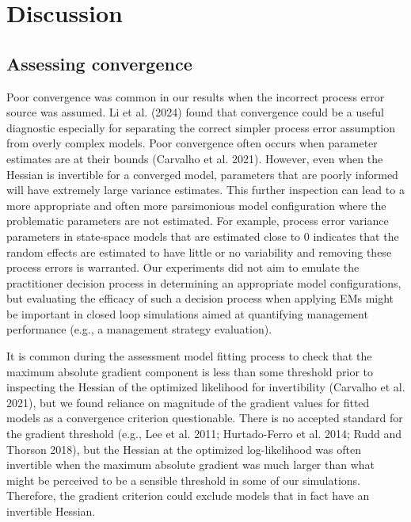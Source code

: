 \documentclass[
  12pt,
]{article}
\begin{document}
\section*{Discussion}\label{discussion}

\subsection*{Assessing convergence}\label{assessing-convergence}

Poor convergence was common in our results when the incorrect process
error source was assumed. Li et al. (2024) found that convergence could
be a useful diagnostic especially for separating the correct simpler
process error assumption from overly complex models. Poor convergence
often occurs when parameter estimates are at their bounds (Carvalho et
al. 2021). However, even when the Hessian is invertible for a converged
model, parameters that are poorly informed will have extremely large
variance estimates. This further inspection can lead to a more
appropriate and often more parsimonious model configuration where the
problematic parameters are not estimated. For example, process error
variance parameters in state-space models that are estimated close to 0
indicates that the random effects are estimated to have little or no
variability and removing these process errors is warranted. Our
experiments did not aim to emulate the practitioner decision process in
determining an appropriate model configurations, but evaluating the
efficacy of such a decision process when applying EMs might be important
in closed loop simulations aimed at quantifying management performance
(e.g., a management strategy evaluation).

It is common during the assessment model fitting process to check that
the maximum absolute gradient component is less than some threshold
prior to inspecting the Hessian of the optimized likelihood for
invertibility (Carvalho et al. 2021), but we found reliance on magnitude
of the gradient values for fitted models as a convergence criterion
questionable. There is no accepted standard for the gradient threshold
(e.g., Lee et al. 2011; Hurtado-Ferro et al. 2014; Rudd and Thorson
2018), but the Hessian at the optimized log-likelihood was often
invertible when the maximum absolute gradient was much larger than what
might be perceived to be a sensible threshold in some of our
simulations. Therefore, the gradient criterion could exclude models that
in fact have an invertible Hessian.
\end{document}
